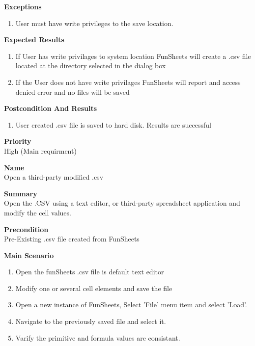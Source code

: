 \documentclass[12pt]{article}
\begin{document}
{\bf Exceptions}\
\begin{enumerate}
\item User must have write privileges to the save location.
\end{enumerate}
{\bf Expected Results}\
\begin{enumerate}
\item If User has write privilages to system location FunSheets will create a .csv file located at the directory selected in the dialog box
\item If the User does not have write privilages FunSheets will report and access denied error and no files will be saved
\end{enumerate}

{\bf Postcondition And Results}\
\begin{enumerate}
\item User created .csv file is saved to hard disk. Results are successful
\end{enumerate}

\noindent
{\bf Priority}\\
High (Main requirment)
\noindent

\clearpage

\noindent
{\bf Name}\\
Open a third-party modified .csv

\noindent
{\bf Summary}\\
Open the .CSV using a text editor, or third-party spreadsheet application and modify the cell values.

\noindent
{\bf Precondition}\\
Pre-Existing .csv file created from FunSheets

\noindent
{\bf Main Scenario}\
\vspace*{-0.2in}
\begin{enumerate}
\item Open the funSheets .csv file is default text editor
\item Modify one or several cell elements and save the file
\item Open a new instance of FunSheets, Select 'File' menu item and select 'Load'.
\item Navigate to the previously saved file and select it.
\item Varify the primitive and formula values are consistant.
\end{enumerate}
\end{document}
